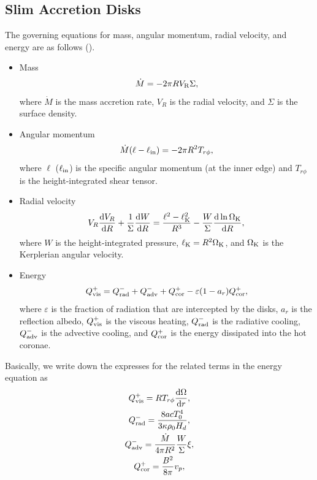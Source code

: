\documentclass[oneside]{book}
\def\rd{{\rm d}}
\begin{document}
\subsection{Slim Accretion Disks}
The governing equations for mass, angular momentum, radial velocity, and energy are as follows
(\citealt{Wang2003}).
\begin{itemize}
 \item Mass
\begin{equation}
\dot M=-2\pi R V_{\rm R}\Sigma,
\label{equ_disk_mass}
\end{equation}
%
where $\dot M$ is the mass accretion rate, $V_R$ is the radial velocity, and $\Sigma$ is the surface density.
\item Angular momentum
%
\begin{equation}
\dot M(\ell-\ell_{\rm in})=-2\pi R^2 T_{r\phi},
\label{equ_disk_am}
\end{equation}
where $\ell$ ($\ell_{\rm in}$) is the specific angular momentum (at the inner edge) and $T_{r\phi}$
is the height-integrated shear tensor.
\item Radial velocity
%
\begin{equation}
V_R\frac{\rd V_R}{\rd R}+\frac{1}{\Sigma}\frac{\rd W}{\rd R}
=\frac{\ell^2-\ell_{\rm K}^2}{R^3}-\frac{W}{\Sigma}\frac{\rd\ln\Omega_{\rm K}}{\rd R},
\label{equ_disk_vel}
\end{equation}
where $W$ is the height-integrated pressure, $\ell_{\rm K}=R^2\Omega_{\rm K}$, and $\Omega_{\rm K}$
is the Kerplerian angular velocity.
\item Energy
%
\begin{equation}
Q_{\rm vis}^+=Q_{\rm rad}^-+Q_{\rm adv}^-+Q_{\rm cor}^+ - \varepsilon(1-a_r)Q_{\rm cor}^+,
\label{equ_disk_energy}
\end{equation}
where $\varepsilon$ is the fraction of radiation that are intercepted by the disks, $a_r$ is the reflection albedo,
$Q_{\rm vis}^+$ is the viscous heating, $Q_{\rm rad}^-$ is the radiative cooling, 
$Q_{\rm adv}^-$ is the advective cooling, and $Q_{\rm cor}^+$ is the energy 
dissipated into the hot coronae. 
\end{itemize}
Basically, we write down the expresses for the related terms in the energy equation as
\begin{gather}
Q_{\rm vis}^+=RT_{r\phi}\frac{\rd\Omega}{\rd r},\\
Q_{\rm rad}^-=\frac{8acT_0^4}{3\kappa\rho_0H_d},\\
Q_{\rm adv}^-=\frac{\dot M}{4\pi R^2}\frac{W}{\Sigma}\xi,\\
Q_{\rm cor}^+=\frac{B^2}{8\pi}v_p,
\end{gather}
\end{document}
